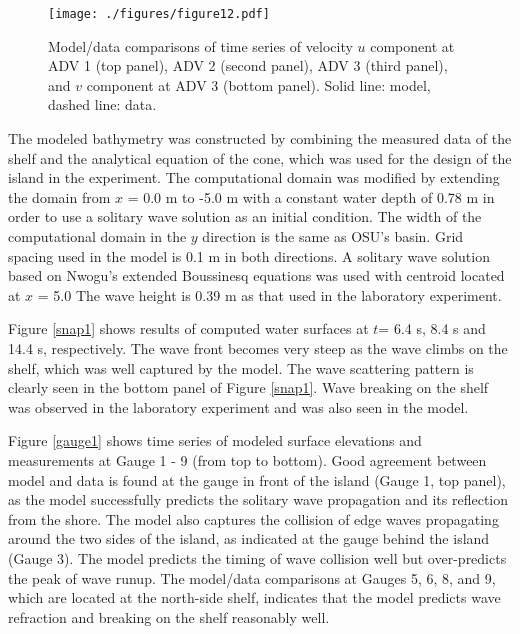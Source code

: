 \documentclass[11pt]{article}
\begin{document}
\begin{figure}[htbp]
\centering
\texttt{[image: ./figures/figure12.pdf]}
\caption{Model/data comparisons of time series of velocity $u$ component at ADV 1  (top panel),  ADV 2 (second panel),  ADV 3 (third panel), and $v$ component at ADV 3 (bottom panel). Solid line: model,  dashed line: data.}
\label{adv1}
\end{figure}


The modeled bathymetry  was constructed by combining the measured data of the shelf and the analytical equation of the cone, which was used for the design of the island in the experiment.   The computational domain was modified by extending the domain from $x$ = 0.0 m to -5.0 m with a constant water depth of 0.78 m in order to use a solitary wave solution as an initial condition. The width of the computational domain in the $y$ direction is the same as OSU's  basin. Grid spacing used in the model is 0.1 m in both directions. A solitary wave solution based on Nwogu's extended Boussinesq equations  was used with  centroid located at $x$ = 5.0  The wave height is 0.39 m as  that used in the laboratory experiment.
 
Figure \ref{snap1} shows results of computed  water surfaces at $t $= 6.4  s, 8.4  s and 14.4 s, respectively. The  wave front becomes very steep as the wave climbs on the shelf, which was well captured by the model. The wave scattering pattern is clearly seen in the bottom panel of Figure \ref{snap1}. Wave breaking on the shelf was observed in the laboratory experiment and was also seen in the  model.  

Figure \ref{gauge1} shows  time series of modeled surface elevations and measurements at Gauge 1 - 9  (from top to bottom). 
Good agreement between model and data is  found at the gauge in front of the island (Gauge 1, top panel), as the model successfully predicts the solitary wave propagation and its reflection from the shore.   The model also captures the collision of edge waves propagating around the two sides of the island,  as indicated at the gauge behind the island (Gauge 3). The model  predicts the timing of wave collision well but over-predicts the peak of wave runup.  The model/data comparisons at Gauges 5, 6, 8, and 9, which are located at the north-side shelf, indicates that the model predicts wave refraction and breaking on the shelf  reasonably well.   
\end{document}
